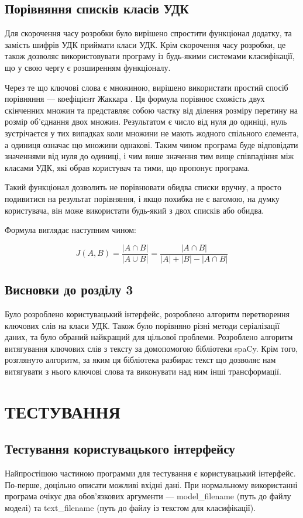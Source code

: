 \documentclass[14pt]{extarticle}
\let\oldsection\section
\renewcommand{\section}{\clearpage\oldsection}
\newcommand{\unnumberedSubsection}[1]{%
  \subsection*{#1}%
  \addcontentsline{toc}{subsection}{#1}%
}
\begin{document}
  \subsection{Порівняння списків класів УДК}

  Для скорочення часу розробки було вирішено спростити функціонал додатку,
  та замість шифрів УДК приймати класи УДК.
  Крім скорочення часу розробки, це також дозволяє використовувати програму
  із будь-якими системами класифікації,
  що у свою чергу є розширенням функціоналу.

  Через те що ключові слова є множиною, вирішено використати простий спосіб
  порівняння --- коефіцієнт Жаккара \cite{wiki_jaccard_index}.
  Ця формула порівнює схожість двух скінченних множин та представляє собою
  частку від ділення розміру перетину \cite{wiki_intersection}
  на розмір об'єднання \cite{wiki_union} двох множин.
  Результатом є число від нуля до одиніці, нуль зустрічаєтся
  у тих випадках коли множини не мають жодного спільного єлемента,
  а одиниця означає що множини однакові.
  Таким чином програма буде відповідати значеннями від нуля до одиниці,
  і чим више значення тим вище співпадіння між класами УДК,
  які обрав користувач та тими, що пропонує програма.

  Такий функціонал дозволить не порівнювати обидва списки вручну,
  а просто подивитися на результат порівняння, і якщо похибка не є вагомою,
  на думку користувача, він може використати будь-який з двох списків або обидва.

  Формула виглядає наступним чином:

  $$J(A, B) =  \frac{| A \cap B |}{ | A \cup B | }
  = \frac{| A \cap B | }{  |A| + |B| - | A \cap B | }$$

  \unnumberedSubsection{Висновки до розділу 3}
  Було розроблено користувацький інтерфейс,
  розроблено алгоритм перетворення ключових слів на класи УДК.
  Також було порівняно різні методи серіалізації даних,
  та було обраний найкращий для цільової проблеми.
  Розроблено алгоритм витягування ключових слів з тексту за
  домопомогою бібліотеки spaCy. Крім того, розглянуто алгоритм,
  за яким ця бібліотека разбирає текст що дозволяє нам витягувати
  з нього ключові слова та виконувати над ним інші трансформації.

  \section{ТЕСТУВАННЯ}
  \subsection{Тестування користувацького інтерфейсу}
  Найпростішою частиною программи для тестування є користувацький інтерфейс.
  По-перше, доцільно описати можливі вхідні дані.
  При нормальному використанні програма очікує два обов'язкових аргументи ---
  model\_filename (путь до файлу моделі) та
  text\_filename (путь до файлу із текстом для класифікації).
\end{document}
